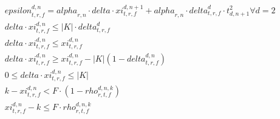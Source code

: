 \begin{align}
  & \mathit{epsilon}_{t , r , f}^{d , n} = \mathit{alpha}_{r , n} \cdot \mathit{delta} \cdot \mathit{xi}_{t , r , f}^{d , n + 1} + \mathit{alpha}_{r , n} \cdot \mathit{delta}_{t , r , f}^{d} \cdot t_{d , n + 1}^{2} \forall d = 2 \tag{eq\_0032} \\
  & \mathit{delta} \cdot \mathit{xi}_{t , r , f}^{d , n} \leq \left|K\right| \cdot \mathit{delta}_{t , r , f}^{d} \tag{eq\_0033} \\
  & \mathit{delta} \cdot \mathit{xi}_{t , r , f}^{d , n} \leq \mathit{xi}_{t , r , f}^{d , n} \tag{eq\_0034} \\
  & \mathit{delta} \cdot \mathit{xi}_{t , r , f}^{d , n} \geq \mathit{xi}_{t , r , f}^{d , n} - \left|K\right| \left(1 - \mathit{delta}_{t , r , f}^{d , n}\right) \tag{eq\_0035} \\
  & 0 \leq \mathit{delta} \cdot \mathit{xi}_{t , r , f}^{d , n} \leq \left|K\right| \tag{eq\_0036} \\
  & k - \mathit{xi}_{t , r , f}^{d , n} < F \cdot \left(1 - \mathit{rho}_{r , t , f}^{d , n , k}\right) \tag{eq\_0037} \\
  & \mathit{xi}_{t , r , f}^{d , n} - k \leq F \cdot \mathit{rho}_{r , t , f}^{d , n , k} \tag{eq\_0038} \\
\end{align}
